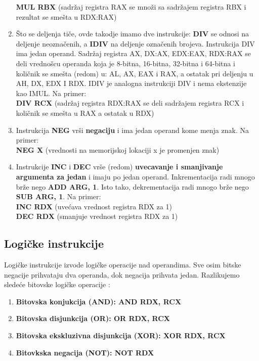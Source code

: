 \documentclass[a4paper]{article}
\begin{document}
\begin{enumerate}
\textbf{MUL RBX} (sadr\v zaj registra RAX se mno\v zi sa sadr\v zajem registra RBX i rezultat se sme\v sta u RDX:RAX)\\ 
\item {\v Sto se deljenja ti\v ce, ovde takodje imamo dve instrukcije: \textbf{DIV} se odnosi na deljenje neozna\v cenih, 
a \textbf{IDIV} na deljenje ozna\v cenih brojeva. Instrukcija DIV ima jedan operand. Sadr\v zaj 
registra AX, DX:AX, EDX:EAX, RDX:RAX se deli vredno\v scu operanda koja je 8-bitna, 16-bitna, 32-bitna i 64-bitna i 
koli\v cnik se sme\v sta (redom) u: AL, AX, EAX i RAX, a ostatak pri deljenju u AH, DX, EDX I RDX. IDIV je analogna 
instrukciji DIV i nema ekstenzije kao IMUL. Na primer:} \\
\textbf{DIV RCX} (sadr\v zaj registra RDX:RAX se deli sadr\v zajem registra RCX i koli\v cnik se sme\v sta u RAX 
a ostatak u RDX) \\ 
\item {Instrukcija \textbf{NEG}} vr\v si \textbf{negaciju} i ima jedan operand kome menja znak. Na primer: \\
\textbf{NEG X} (vrednosti na memorijskoj lokaciji x je promenjen znak)\\ 
\item {Instrukcije \textbf{INC} i \textbf{DEC} vr\v se (redom) \textbf{uvecavanje i smanjivanje argumenta za jedan} i imaju po jedan operand.
Inkrementacija radi mnogo br\v ze nego \textbf {ADD ARG, 1}. Isto tako, dekrementacija radi mnogo br\v ze nego 
\textbf{SUB ARG, 1}. Na primer:} \\
\textbf{INC RDX} (uve\' cava vrednost registra RDX za 1)\\
\textbf{DEC RDX} (smanjuje vrednost registra RDX za 1)\\ 
\end{enumerate}

\subsection{\textbf{Logi\v cke instrukcije}}
Logi\v cke instrukcije izvode logi\v cke operacije nad operandima. Sve osim bitske negacije prihvataju dva operanda, 
dok negacija prihvata jedan. Razlikujemo slede\' ce bitovske logi\v cke operacije \cite{x86Assembly}:
\begin{enumerate}
\item {\textbf{Bitovska konjukcija (AND): AND RDX, RCX}}
\item {\textbf{Bitovska disjunkcija (OR): OR RDX, RCX}}
\item {\textbf{Bitovska ekskluzivna disjunkcija (XOR): XOR RDX, RCX}}
\item {\textbf{Bitovkska negacija (NOT): NOT RDX}}
\end{enumerate}
\end{document}
